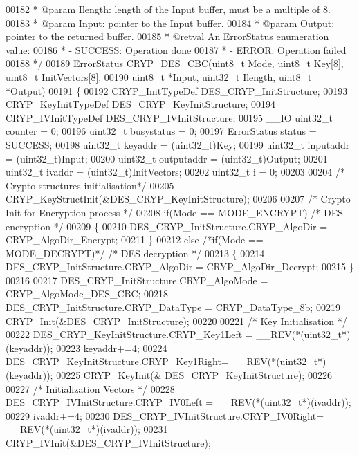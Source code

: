 \begin{DoxyCode}
00182 \textcolor{comment}{  * @param  Ilength: length of the Input buffer, must be a multiple of 8.}
00183 \textcolor{comment}{  * @param  Input: pointer to the Input buffer.}
00184 \textcolor{comment}{  * @param  Output: pointer to the returned buffer.}
00185 \textcolor{comment}{  * @retval An ErrorStatus enumeration value:}
00186 \textcolor{comment}{  *          - SUCCESS: Operation done}
00187 \textcolor{comment}{  *          - ERROR: Operation failed}
00188 \textcolor{comment}{  */}
00189 ErrorStatus CRYP_DES_CBC(uint8\_t Mode, uint8\_t Key[8], uint8\_t InitVectors[8],
00190                          uint8\_t *Input, uint32\_t Ilength, uint8\_t *Output)
00191 \{
00192   CRYP\_InitTypeDef DES\_CRYP\_InitStructure;
00193   CRYP\_KeyInitTypeDef DES\_CRYP\_KeyInitStructure;
00194   CRYP\_IVInitTypeDef DES\_CRYP\_IVInitStructure;
00195   \_\_IO uint32\_t counter = 0;
00196   uint32\_t busystatus = 0;
00197   ErrorStatus status = SUCCESS;
00198   uint32\_t keyaddr    = (uint32\_t)Key;
00199   uint32\_t inputaddr  = (uint32\_t)Input;
00200   uint32\_t outputaddr = (uint32\_t)Output;
00201   uint32\_t ivaddr     = (uint32\_t)InitVectors;
00202   uint32\_t i = 0;
00203 
00204   \textcolor{comment}{/* Crypto structures initialisation*/}
00205   CRYP_KeyStructInit(&DES\_CRYP\_KeyInitStructure);
00206 
00207   \textcolor{comment}{/* Crypto Init for Encryption process */}
00208   \textcolor{keywordflow}{if}(Mode == MODE_ENCRYPT) \textcolor{comment}{/* DES encryption */}
00209   \{
00210      DES\_CRYP\_InitStructure.CRYP_AlgoDir  = CRYP_AlgoDir_Encrypt;
00211   \}
00212   \textcolor{keywordflow}{else} \textcolor{comment}{/*if(Mode == MODE\_DECRYPT)*/} \textcolor{comment}{/* DES decryption */}
00213   \{
00214      DES\_CRYP\_InitStructure.CRYP_AlgoDir  = CRYP_AlgoDir_Decrypt;
00215   \}
00216 
00217   DES\_CRYP\_InitStructure.CRYP_AlgoMode = CRYP_AlgoMode_DES_CBC;
00218   DES\_CRYP\_InitStructure.CRYP_DataType = CRYP_DataType_8b;
00219   CRYP_Init(&DES\_CRYP\_InitStructure);
00220 
00221   \textcolor{comment}{/* Key Initialisation */}
00222   DES\_CRYP\_KeyInitStructure.CRYP\_Key1Left = \_\_REV(*(uint32\_t*)(keyaddr));
00223   keyaddr+=4;
00224   DES\_CRYP\_KeyInitStructure.CRYP\_Key1Right= \_\_REV(*(uint32\_t*)(keyaddr));
00225   CRYP_KeyInit(& DES\_CRYP\_KeyInitStructure);
00226 
00227   \textcolor{comment}{/* Initialization Vectors */}
00228   DES\_CRYP\_IVInitStructure.CRYP\_IV0Left = \_\_REV(*(uint32\_t*)(ivaddr));
00229   ivaddr+=4;
00230   DES\_CRYP\_IVInitStructure.CRYP\_IV0Right= \_\_REV(*(uint32\_t*)(ivaddr));
00231   CRYP_IVInit(&DES\_CRYP\_IVInitStructure);

\end{DoxyCode}
